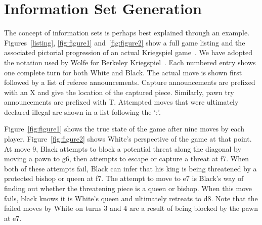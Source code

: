 \documentclass[10pt, conference, compsocconf]{IEEEtran}
\begin{document}
\section{Information Set Generation}
\label{info}
The concept of information sets is perhaps best explained through an example. 
Figures~\ref{listing}, \ref{fig:figure1} and~\ref{fig:figure2} show a full game listing and the associated pictorial progression of an actual
Kriegspiel game~\cite{li94chess}.  We have adopted the notation used by Wolfe for Berkeley Kriegspiel~\cite{wolfe07exploiting}.  Each numbered entry shows one complete turn for both White and Black.  The actual move is shown
first followed by a list of referee announcements.  Capture announcements are prefixed with an X and give the location
of the captured piece.  Similarly, pawn try announcements are prefixed with T.  Attempted moves that were ultimately
declared illegal are shown in a list following the `:'.  

Figure~\ref{fig:figure1} shows the true state of the game after nine moves by
each player.  Figure~\ref{fig:figure2} shows White's perspective of the game at
that point. At move 9, Black attempts to block a
potential threat along the diagonal by moving a pawn to g6, then attempts to
escape or capture a threat at f7.  When both of these attempts fail, Black can
infer that his king is being threatened by a protected bishop or queen at f7.
The attempt to move to e7 is Black's way of finding out whether the threatening
piece is a queen or bishop.  When this move fails, black knows it is White's
queen and ultimately retreats to d8.  Note that the failed moves by White on
turns 3 and 4 are a result of being blocked by the pawn at e7.
\end{document}
